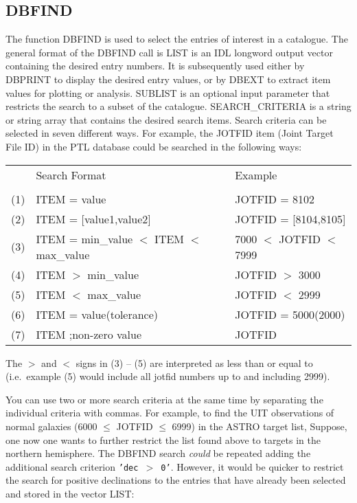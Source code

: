 \subsection{DBFIND}

The function DBFIND is used to select the entries of interest in a catalogue.
The general format of the DBFIND call is
LIST is an IDL longword output vector containing the desired entry numbers.  It is 
subsequently used either by DBPRINT to display the desired entry values, or
by DBEXT to extract item values for plotting or analysis.   SUBLIST is
an optional input parameter that restricts the search to a subset of the
catalogue.   SEARCH\_CRITERIA is a string or string array that contains
the desired search items.
Search criteria can be selected in seven different ways.  For example, the
JOTFID item (Joint Target File ID) in the PTL database could be searched in
the following ways: \\
\vspace{0.1in}
\begin{tabular}{lll}
 & Search Format & Example     \\
  &   & \\
(1) & ITEM = value & JOTFID = 8102 \\
(2) & ITEM = [value1,value2] & JOTFID = [8104,8105] \\
(3) & ITEM = min\_value $<$ ITEM $<$ max\_value  & 7000 $<$ JOTFID $<$ 7999 \\
(4) & ITEM $>$ min\_value    & JOTFID $>$ 3000 \\
(5) & ITEM $<$ max\_value    & JOTFID $<$ 2999 \\
(6) & ITEM = value(tolerance) & JOTFID = 5000(2000) \\
(7) & ITEM  ;non-zero value & JOTFID   \\
\end{tabular}
\vspace{0.1in}

The $>$ and $<$ signs in (3) -- (5) are interpreted as less than or equal to
(i.e.\ example (5) would include all jotfid numbers up to and including 2999).

You can use two or more search criteria at the same time by separating the
individual criteria with commas.  For example, to find the UIT observations
of normal galaxies (6000 $\leq$ JOTFID $\leq$ 6999) in the ASTRO target list,
\exbegin
{}  
\exend
Suppose, one now one wants to further restrict the list found above to targets in
the northern hemisphere.  The DBFIND search {\em could} be repeated adding
the additional search criterion {\tt 'dec $>$ 0'}.  However, it would be quicker
to restrict the search for positive declinations to the entries that have
already been selected and stored in the vector LIST:

